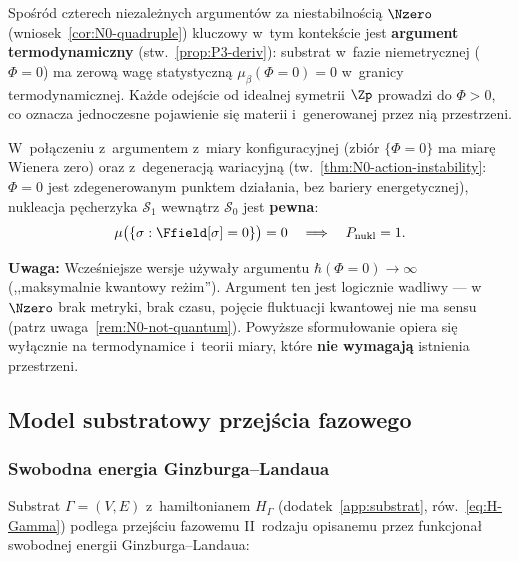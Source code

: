 \begin{remark}\label{rem:N0-unstable-G}
Spo\'sr\'od czterech niezale\.znych argument\'ow za niestabilno\'sci\k{a}
$\Nzero$ (wniosek~\ref{cor:N0-quadruple}) kluczowy w~tym
kontek\'scie jest \textbf{argument termodynamiczny}
(stw.~\ref{prop:P3-deriv}): substrat w~fazie niemetrycznej
($\Phi = 0$) ma zerow\k{a} wag\k{e} statystyczn\k{a}
$\mu_\beta(\Phi = 0) = 0$ w~granicy termodynamicznej.
Ka\.zde odej\'scie od idealnej symetrii $\Zp$ prowadzi do
$\Phi > 0$, co oznacza jednoczesne pojawienie si\k{e}
materii i~generowanej przez ni\k{a} przestrzeni.

W~po\l{}\k{a}czeniu z~argumentem z~miary konfiguracyjnej
(zbi\'or $\{\Phi = 0\}$ ma miar\k{e} Wienera zero)
oraz z~degeneracj\k{a} wariacyjn\k{a}
(tw.~\ref{thm:N0-action-instability}: $\Phi = 0$
jest zdegenerowanym punktem dzia\l{}ania, bez bariery
energetycznej), nukleacja p\k{e}cherzyka $\mathcal{S}_1$
wewn\k{a}trz $\mathcal{S}_0$ jest \textbf{pewna}:
\begin{equation}\label{eq:nucleation-certainty}
    \mu\bigl(\{\sigma : \Ffield[\sigma] = 0\}\bigr) = 0
    \quad\Longrightarrow\quad
    P_{\mathrm{nukl}} = 1.
\end{equation}

\textbf{Uwaga:} Wcze\'sniejsze wersje u\.zywa\l{}y argumentu
$\hbar(\Phi\!=\!0) \to \infty$ (,,maksymalnie kwantowy
re\.zim''). Argument ten jest logicznie wadliwy --- w~$\Nzero$
brak metryki, brak czasu, poj\k{e}cie fluktuacji kwantowej
nie ma sensu (patrz uwaga~\ref{rem:N0-not-quantum}).
Powy\.zsze sformu\l{}owanie opiera si\k{e} wy\l{}\k{a}cznie
na termodynamice i~teorii miary, kt\'ore \textbf{nie wymagaj\k{a}}
istnienia przestrzeni.
\end{remark}

\subsection{Model substratowy przej\'scia fazowego}%
\label{app:G-model}

\subsubsection{Swobodna energia Ginzburga--Landaua}

Substrat $\Gamma = (V,E)$ z~hamiltonianem $H_\Gamma$
(dodatek~\ref{app:substrat}, r\'ow.~\eqref{eq:H-Gamma})
podlega przej\'sciu fazowemu II~rodzaju opisanemu przez
funkcjona\l{} swobodnej energii Ginzburga--Landaua:

